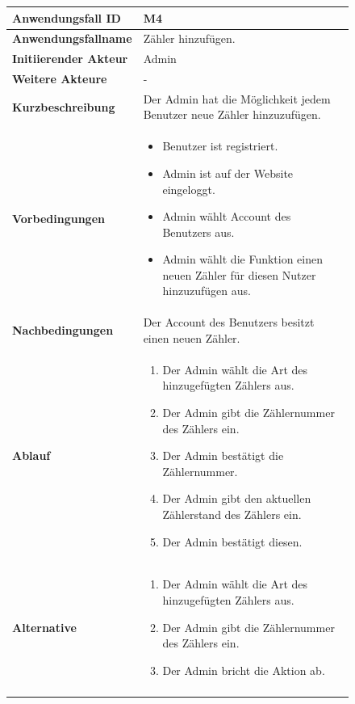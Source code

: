 \newpage

\begin{figure}[h]
	\centering
	\begin{tabularx}{\textwidth}{ X | X }

		\textbf{Anwendungsfall ID} & M4 \\ \hline
		\textbf{Anwendungsfallname} & Zähler hinzufügen. \\ \hline
		\textbf{Initiierender Akteur} & Admin \\ \hline
		\textbf{Weitere Akteure} & - \\ \hline
		\textbf{Kurzbeschreibung} & Der Admin hat die Möglichkeit jedem Benutzer neue Zähler hinzuzufügen.   \\ \hline
		\textbf{Vorbedingungen} & 
		\begin {itemize}
			\item Benutzer ist registriert. 
			\item Admin ist auf der Website eingeloggt.
			\item Admin wählt Account des Benutzers aus.
			\item Admin wählt die Funktion einen neuen Zähler für diesen Nutzer hinzuzufügen aus.
		\end{itemize}\\ \hline
		\textbf{Nachbedingungen} & Der Account des Benutzers besitzt einen neuen Zähler. \\ \hline
		\textbf{Ablauf} &
		\begin{enumerate}
			\item Der Admin wählt die Art des hinzugefügten Zählers aus.
			\item Der Admin gibt die Zählernummer des Zählers ein.
			\item Der Admin bestätigt die Zählernummer.
			\item Der Admin gibt den aktuellen Zählerstand des Zählers ein.
			\item Der Admin bestätigt diesen.
		\end{enumerate} \\ \hline
		\textbf{Alternative} & 
		\begin{enumerate}
			\item Der Admin wählt die Art des hinzugefügten Zählers aus.
			\item Der Admin gibt die Zählernummer des Zählers ein.
			\item Der Admin bricht die Aktion ab.
		\end{enumerate} \\ &
	\end{tabularx}
\end{figure}

